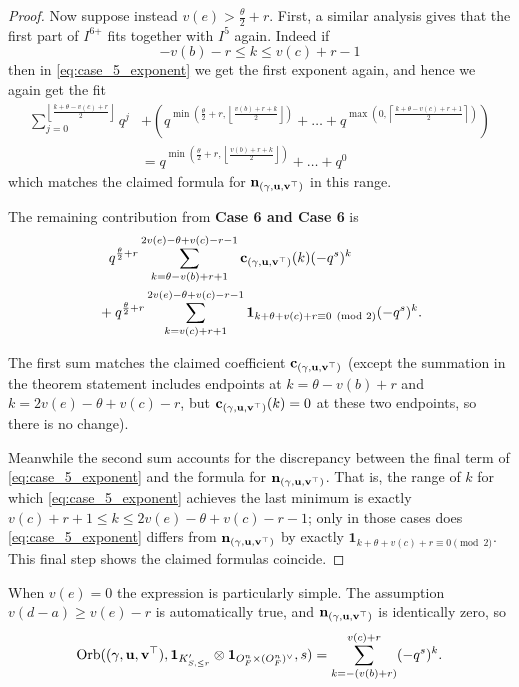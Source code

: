\begin{proof}
  Now suppose instead $v(e) > \frac{\theta}{2} + r$.
  First, a similar analysis gives that the first part of $I^{\text{6+}}$ fits
  together with $I^{\text{5}}$ again.
  Indeed if
  \[ -v(b) - r \le k \le v(c) + r - 1 \]
  then in \eqref{eq:case_5_exponent} we get the first exponent again, and hence
  we again get the fit
  \begin{align*}
    \sum_{j=0}^{\left\lfloor \frac{k+\theta-v(c)+r}{2} \right\rfloor} q^j
    &+
    \left(
    q^{\min\left( \frac{\theta}{2} + r, \left\lfloor \frac{v(b) + r + k}{2} \right\rfloor \right)}
    + \dots
    + q^{\max\left(0, \left\lceil \frac{k + \theta - v(c) + r + 1}{2} \right\rceil \right)}
    \right) \\
    &=
    q^{\min(\frac{\theta}{2}+r, \left\lfloor \frac{v(b) + r + k}{2} \right\rfloor)} + \dots + q^0
  \end{align*}
  which matches the claimed formula for $\mathbf n_{(\gamma, \mathbf u, \mathbf v^\top)}$ in this range.

  The remaining contribution from \textbf{Case 6\ts{+} and Case 6\ts{-}} is
  \begin{align*}
  &\phantom+ q^{\frac{\theta}{2} + r}
  \sum_{k = \theta - v(b) + r + 1}^{2v(e) - \theta + v(c) - r - 1} \cc_\guv(k)(-q^s)^k \\
  &+ q^{\frac{\theta}{2} + r}
  \sum_{k = v(c) + r + 1}^{2v(e) - \theta + v(c) - r - 1}
  \mathbf{1}_{k + \theta + v(c) + r \equiv 0 \pmod 2} (-q^s)^k.
  \end{align*}

  The first sum matches the claimed coefficient $\mathbf c_{(\gamma, \mathbf u, \mathbf v^\top)}$
  (except the summation in the theorem statement includes
  endpoints at $k = \theta - v(b) + r$
  and $k = 2v(e) - \theta + v(c) - r$,
  but $\mathbf c_{(\gamma, \mathbf u, \mathbf v^\top)}(k) = 0$ at these two endpoints,
  so there is no change).

  Meanwhile the second sum accounts for the discrepancy between
  the final term of \eqref{eq:case_5_exponent} and the formula for $\mathbf n_{(\gamma, \mathbf u, \mathbf v^\top)}$.
  That is, the range of $k$ for which \eqref{eq:case_5_exponent}
  achieves the last minimum is exactly
  $v(c) + r + 1 \le k \le 2v(e) - \theta + v(c) - r - 1$;
  only in those cases does \eqref{eq:case_5_exponent}
  differs from $\mathbf n_{(\gamma, \mathbf u, \mathbf v^\top)}$ by exactly
  $\mathbf{1}_{k + \theta + v(c) + r \equiv 0 \pmod 2}$.
  This final step shows the claimed formulas coincide.
\end{proof}

\begin{example}
  When $v(e) = 0$ the expression is particularly simple.
  The assumption $v(d-a) \ge v(e)-r$ is automatically true, and
  $\mathbf n_{{(\gamma, \mathbf u, \mathbf v^\top)}}$ is identically zero, so
  \[ \operatorname{Orb}({(\gamma, \mathbf u, \mathbf v^\top)}, \mathbf{1}_{K'_{S, \le r}} \otimes \mathbf{1}_{O_F^n \times (O_F^n)^\vee}, s)
    = \sum_{k=-(v(b)+r)}^{v(c)+r} (-q^s)^k. \]
\end{example}


